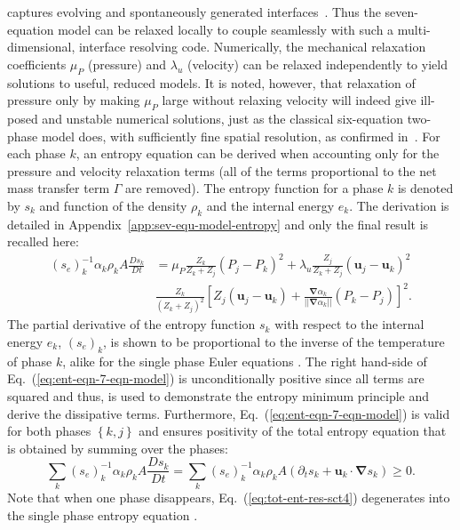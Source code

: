 \documentclass[preprint,10pt]{elsarticle}
\newcommand{\grad}{\mbold{\nabla}}
\newcommand{\mbold}[1]{\boldsymbol#1}
\newcommand{\eqt}[1]{Eq.~(\ref{#1})}                     %
\newcommand{\app}[1]{Appendix~\ref{#1}}                   %
\begin{document}
captures evolving and spontaneously generated
interfaces~\cite{Saurel_2009}. Thus the seven-equation model
can be relaxed locally to couple seamlessly with such a
multi-dimensional, interface resolving code. Numerically, the mechanical relaxation coefficients $\mu_P$
(pressure) and $\lambda_u$ (velocity) can be relaxed independently to
yield solutions to useful, reduced models.  It
is noted, however, that relaxation of pressure only by making $\mu_P$
large without relaxing velocity will indeed give ill-posed and
unstable numerical solutions, just as the classical six-equation
two-phase model does, with sufficiently fine spatial resolution, as
confirmed in~\cite{SEM,Herrard_2005}. For each phase $k$, an entropy equation can be derived when accounting only for the pressure and velocity relaxation terms (all of the terms proportional to the net mass transfer term $\Gamma$ are removed). The entropy function for a phase $k$ is denoted by $s_k$ and function of the density $\rho_k$ and the internal energy $e_k$. The derivation is detailed in \app{app:sev-equ-model-entropy} and only the final result is recalled here:
%
\begin{align}\label{eq:ent-eqn-7-eqn-model}
(s_{e})_k^{-1} \alpha_k \rho_k A \frac{Ds_k}{Dt} &= \mu_P \frac{Z_k}{Z_k+Z_j} (P_j - P_k)^2 + \lambda_u \frac{Z_j}{Z_k+Z_j} (\mbold u_j -\mbold  u_k)^2 \nonumber
\\
& \frac{Z_k}{\left( Z_k+Z_j \right)^2} \left[ Z_j (\mbold u_j-\mbold u_k)+\frac{\grad \alpha_k}{|| \grad \alpha_k ||}(P_k-P_j)\right]^2.
\end{align}
The partial derivative of the entropy function $s_k$ with respect to the internal energy $e_k$, $(s_e)_k$, is shown to be proportional to the inverse of the temperature of phase $k$, alike for the single phase Euler equations \cite{jlg, Marco_dissertation}. The right hand-side of \eqt{eq:ent-eqn-7-eqn-model} is unconditionally positive since all terms are squared and thus, is used to demonstrate the entropy minimum principle and derive the dissipative terms. Furthermore, \eqt{eq:ent-eqn-7-eqn-model} is valid for both phases $\left\{k, j\right\}$ and ensures positivity of the total entropy equation that is obtained by summing over the phases:
%
\begin{equation}\label{eq:tot-ent-res-sct4}
\sum_k (s_{e})_k^{-1} \alpha_k \rho_k A \frac{Ds_k}{Dt} = \sum_k (s_{e})_k^{-1} \alpha_k \rho_k A \left( \partial_t s_k + \mbold u_k \cdot \grad s_k \right) \geq 0  .
\end{equation}
%
Note that when one phase disappears, \eqt{eq:tot-ent-res-sct4} degenerates into the single phase entropy equation \cite{SEM, Marco_dissertation}.
\end{document}
